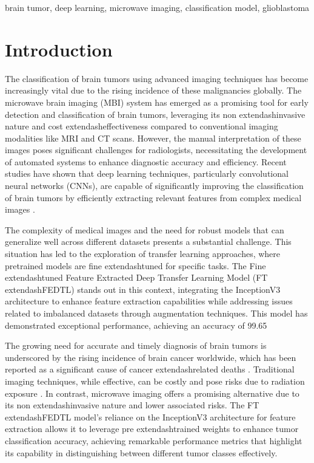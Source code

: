\documentclass[runningheads]{llncs}
\begin{document}
\begin{keywords}
brain tumor, deep learning, microwave imaging, classification model, glioblastoma
\end{keywords}

\section{Introduction}
The classification of brain tumors using advanced imaging techniques has become increasingly vital due to the rising incidence of these malignancies globally. The microwave brain imaging (MBI) system has emerged as a promising tool for early detection and classification of brain tumors, leveraging its non	extendash{}invasive nature and cost	extendash{}effectiveness compared to conventional imaging modalities like MRI and CT scans. However, the manual interpretation of these images poses significant challenges for radiologists, necessitating the development of automated systems to enhance diagnostic accuracy and efficiency. Recent studies have shown that deep learning techniques, particularly convolutional neural networks (CNNs), are capable of significantly improving the classification of brain tumors by efficiently extracting relevant features from complex medical images \cite{Vivian_2024}.

The complexity of medical images and the need for robust models that can generalize well across different datasets presents a substantial challenge. This situation has led to the exploration of transfer learning approaches, where pretrained models are fine	extendash{}tuned for specific tasks. The Fine	extendash{}tuned Feature Extracted Deep Transfer Learning Model (FT	extendash{}FEDTL) stands out in this context, integrating the InceptionV3 architecture to enhance feature extraction capabilities while addressing issues related to imbalanced datasets through augmentation techniques. This model has demonstrated exceptional performance, achieving an accuracy of 99.65%

The growing need for accurate and timely diagnosis of brain tumors is underscored by the rising incidence of brain cancer worldwide, which has been reported as a significant cause of cancer	extendash{}related deaths \cite{Amran_2024}. Traditional imaging techniques, while effective, can be costly and pose risks due to radiation exposure \cite{Chun_2025}. In contrast, microwave imaging offers a promising alternative due to its non	extendash{}invasive nature and lower associated risks. The FT	extendash{}FEDTL model's reliance on the InceptionV3 architecture for feature extraction allows it to leverage pre	extendash{}trained weights to enhance tumor classification accuracy, achieving remarkable performance metrics that highlight its capability in distinguishing between different tumor classes effectively.
\end{document}
